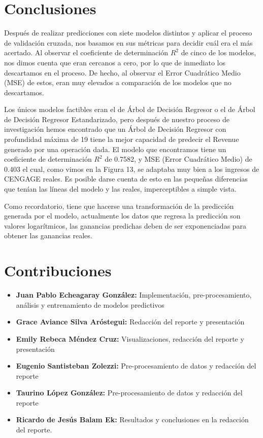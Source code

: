\documentclass{article}
\begin{document}
    \section{Conclusiones}
        Después de realizar predicciones con siete modelos distintos y aplicar el proceso de validación cruzada, nos basamos en sus métricas para decidir cuál era el más acertado. Al observar el coeficiente de determinación $R^{2}$ de cinco de los modelos, nos dimos cuenta que eran cercanos a cero, por lo que de inmediato los descartamos en el proceso. De hecho, al observar el Error Cuadrático Medio (MSE) de estos, eran muy elevados a comparación de los modelos que no descartamos.
        
        Los únicos modelos factibles eran el de Árbol de Decisión Regresor o el de Árbol de Decisión Regresor Estandarizado, pero después de nuestro proceso de investigación hemos encontrado que un Árbol de Decisión Regresor con profundidad máxima de 19 tiene la mejor capacidad de predecir el Revenue generado por una operación dada. El modelo que encontramos tiene un coeficiente de determinación $R^{2}$ de 0.7582, y MSE (Error Cuadrático Medio) de 0.403 el cual, como vimos en la Figura 13, se adaptaba muy bien a los ingresos de CENGAGE reales. Es posible darse cuenta de esto en las pequeñas diferencias que tenían las líneas del modelo y las reales, imperceptibles a simple vista.
        
        Como recordatorio, tiene que hacerse una transformación de la predicción generada por el modelo, actualmente los datos que regresa la predicción son valores logarítmicos, las ganancias predichas deben de ser exponenciadas para obtener las ganancias reales.

    \section{Contribuciones}
        \begin{itemize}
            \item \textbf{Juan Pablo Echeagaray González:} Implementación, pre-procesamiento, análisis y entrenamiento de modelos predictivos
            \item \textbf{Grace Aviance Silva Aróstegui:} Redacción del reporte y presentación
            \item \textbf{Emily Rebeca Méndez Cruz:} Visualizaciones, redacción del reporte y presentación
            \item \textbf{Eugenio Santisteban Zolezzi:} Pre-procesamiento de datos y redacción del reporte
            \item \textbf{Taurino López González:} Pre-procesamiento de datos y redacción del reporte
            \item \textbf{Ricardo de Jesús Balam Ek:} Resultados y  conclusiones en la redacción del reporte.
        \end{itemize}


    \clearpage
    \nocite{*}
    \printbibliography
\end{document}
